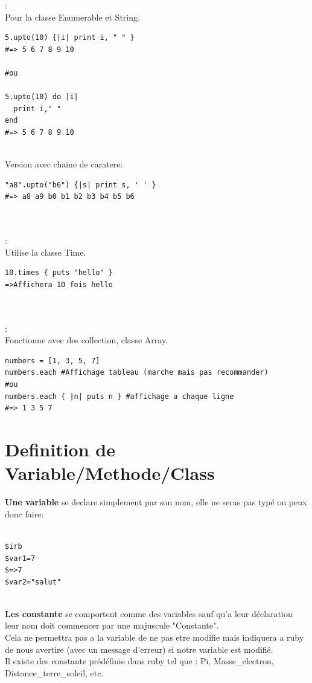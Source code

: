 \documentclass[a4paper,12pt,openany]{book}
\begin{document}
:\\
Pour la classe Enumerable et String.\\
\begin{verbatim}
5.upto(10) {|i| print i, " " }   
#=> 5 6 7 8 9 10

#ou

5.upto(10) do |i|
  print i," "
end
#=> 5 6 7 8 9 10
\end{verbatim}
\\
Version avec chaine de caratere:\\
\begin{verbatim}
"a8".upto("b6") {|s| print s, ' ' }
#=> a8 a9 b0 b1 b2 b3 b4 b5 b6
\end{verbatim}
\\
\\
:\\
Utilise la classe Time.\\
\begin{verbatim}
10.times { puts "hello" }
=>Affichera 10 fois hello
\end{verbatim}
\\
\\
:\\
Fonctionne avec des collection, classe Array.\\
\begin{verbatim}
numbers = [1, 3, 5, 7]
numbers.each #Affichage tableau (marche mais pas recommander)
#ou
numbers.each { |n| puts n } #affichage a chaque ligne
#=> 1 3 5 7
\end{verbatim}



\section{Definition de Variable/Methode/Class}

\textbf{Une variable} se declare simplement par son nom, elle ne seras pas typé on peux donc faire:\\
\\
\begin{verbatim}
$irb
$var1=7
$=>7
$var2="salut"
\end{verbatim}
\\
\textbf{Les constante} se comportent comme des variables sauf qu'a leur déclaration leur nom doit commencer par une majuscule "Constante".\\
Cela ne permettra pas a la variable de ne pas etre modifie mais indiquera a ruby de nous avertire (avec un message d'erreur) si notre variable est modifié.\\ 
Il existe des constante prédéfinie dans ruby tel que : Pi, Masse_electron, Distance_terre_soleil, etc.\\
\\
\end{document}
